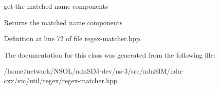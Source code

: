 get the matched name components 

\begin{DoxyReturn}{Returns}
the matched name components 
\end{DoxyReturn}


Definition at line 72 of file regex-\/matcher.\+hpp.



The documentation for this class was generated from the following file\+:\begin{DoxyCompactItemize}
\item 
/home/network/\+N\+S\+O\+L/ndn\+S\+I\+M-\/dev/ns-\/3/src/ndn\+S\+I\+M/ndn-\/cxx/src/util/regex/regex-\/matcher.\+hpp\end{DoxyCompactItemize}
